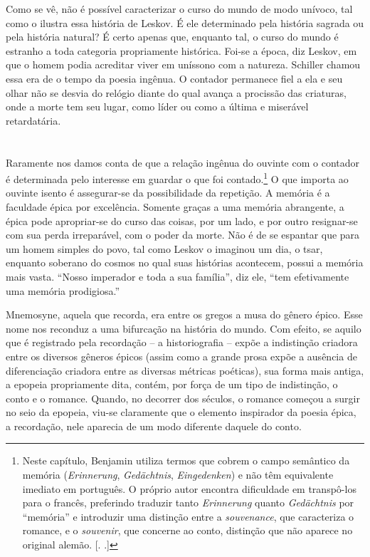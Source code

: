 Como se vê, não é possível caracterizar o curso do mundo de modo
unívoco, tal como o ilustra essa história de Leskov. É ele determinado
pela história sagrada ou pela história natural? É certo apenas que,
enquanto tal, o curso do mundo é estranho a toda categoria propriamente
histórica. Foi-se a época, diz Leskov, em que o homem podia acreditar
viver em uníssono com a natureza. Schiller chamou essa era de o tempo da
poesia ingênua. O contador permanece fiel a ela e seu olhar não se
desvia do relógio diante do qual avança a procissão das criaturas, onde
a morte tem seu lugar, como líder ou como a última e miserável retardatária.

\section{}

Raramente nos damos conta de que a relação ingênua do ouvinte com o
contador é determinada pelo interesse em guardar o que foi contado.\footnote{Neste capítulo, Benjamin utiliza termos que cobrem o campo
  semântico da memória (\emph{Erinnerung}, \emph{Gedächtnis},
  \emph{Eingedenken}) e não têm equivalente imediato em português. O
  próprio autor encontra dificuldade em transpô-los para o francês,
  preferindo traduzir tanto \emph{Erinnerung} quanto \emph{Gedächtnis}
  por ``memória'' e introduzir uma distinção entre a \emph{souvenance},
  que caracteriza o romance, e o \emph{souvenir}, que concerne ao conto,
  distinção que não aparece no original alemão. [. .]} O
que importa ao ouvinte isento é assegurar-se da possibilidade da
repetição. A memória é a faculdade épica por excelência. Somente graças
a uma memória abrangente, a épica pode apropriar-se do curso das coisas,
por um lado, e por outro resignar-se com sua perda irreparável, com o
poder da morte. Não é de se espantar que para um homem simples do povo,
tal como Leskov o imaginou um dia, o tsar, enquanto soberano do cosmos
no qual suas histórias acontecem, possui a memória mais vasta. ``Nosso
imperador e toda a sua família'', diz ele, ``tem efetivamente uma memória
prodigiosa.''

Mnemosyne, aquela que recorda, era entre os gregos a musa do gênero
épico. Esse nome nos reconduz a uma bifurcação na história do mundo. Com
efeito, se aquilo que é registrado pela recordação -- a historiografia
-- expõe a indistinção criadora entre os diversos gêneros épicos (assim
como a grande prosa expõe a ausência de diferenciação criadora entre as
diversas métricas poéticas), sua forma mais antiga, a epopeia
propriamente dita, contém, por força de um tipo de indistinção, o conto
e o romance. Quando, no decorrer dos séculos, o romance começou a surgir
no seio da epopeia, viu-se claramente que o elemento inspirador da
poesia épica, a recordação, nele aparecia de um modo diferente daquele
do conto.

